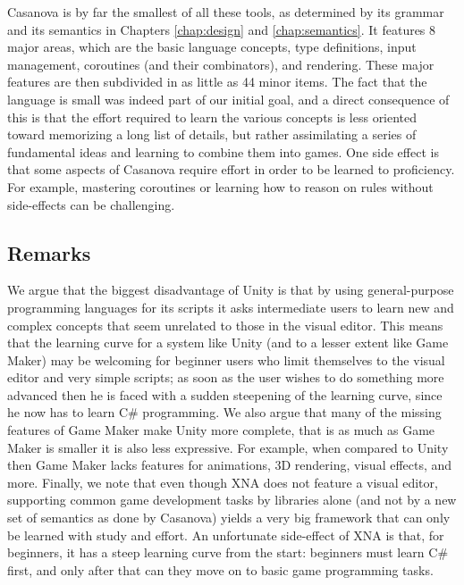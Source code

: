 Casanova is by far the smallest of all these tools, as determined by its grammar and its semantics in Chapters \ref{chap:design} and \ref{chap:semantics}. It features 8 major areas, which are the basic language concepts, type definitions, input management, coroutines (and their combinators), and rendering. These major features are then subdivided in as little as 44 minor items. The fact that the language is small was indeed part of our initial goal, and a direct consequence of this is that the effort required to learn the various concepts is less oriented toward memorizing a long list of details, but rather assimilating a series of fundamental ideas and learning to combine them into games. One side effect is that some aspects of Casanova require effort in order to be learned to proficiency. For example, mastering coroutines or learning how to reason on rules without side-effects can be challenging.

\subsection{Remarks}
We argue that the biggest disadvantage of Unity is that by using general-purpose programming languages for its scripts it asks intermediate users to learn new and complex concepts that seem unrelated to those in the visual editor. This means that the learning curve for a system like Unity (and to a lesser extent like Game Maker) may be welcoming for beginner users who limit themselves to the visual editor and very simple scripts; as soon as the user wishes to do something more advanced then he is faced with a sudden steepening of the learning curve, since he now has to learn C\# programming. We also argue that many of the missing features of Game Maker make Unity more complete, that is as much as Game Maker is smaller it is also less expressive. For example, when compared to Unity then Game Maker lacks features for animations, 3D rendering, visual effects, and more. Finally, we note that even though XNA does not feature a visual editor, supporting common game development tasks by libraries alone (and not by a new set of semantics as done by Casanova) yields a very big framework that can only be learned with study and effort. An unfortunate side-effect of XNA is that, for beginners, it has a steep learning curve from the start: beginners must learn C\# first, and only after that can they move on to basic game programming tasks.

